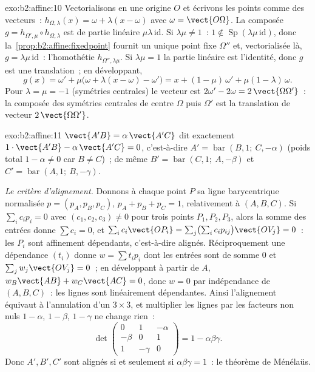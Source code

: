 \begin{solution}{exo:b2:affine:10}
Vectorialisons en une origine $O$ et écrivons les points comme des
vecteurs~: $h_{\Omega, \lambda}(x) = \omega + \lambda(x - \omega)$ avec
$\omega = \vect{O\Omega}$. La composée $g = h_{\Omega',
\mu} \circ h_{\Omega, \lambda}$ est  de partie linéaire
$\mu\lambda\,\mathrm{id}$. Si $\lambda\mu \neq 1$~: $1 \notin
\operatorname{Sp}(\lambda\mu\,\mathrm{id})$, donc
la~\cref{prop:b2:affine:fixedpoint} fournit un unique point fixe
$\Omega''$ et, vectorialisée là, $g =
\lambda\mu\,\mathrm{id}$~: l'homothétie $h_{\Omega'',
\lambda\mu}$. Si $\lambda\mu = 1$ la partie linéaire est
l'identité, donc $g$ est une translation~; en développant,
\[
g(x) = \omega' + \mu\bigl(\omega + \lambda(x - \omega) -
\omega'\bigr) = x + (1 - \mu)\,\omega' + \mu(1 -
\lambda)\,\omega .
\]
Pour $\lambda = \mu = -1$ (symétries centrales) le vecteur est
$2\omega' - 2\omega = 2\,\vect{\Omega\Omega'}$~: la composée des
symétries centrales de centre $\Omega$ puis $\Omega'$ est la
translation de vecteur $2\,\vect{\Omega\Omega'}$.
\end{solution}

\begin{solution}{exo:b2:affine:11}
$\vect{A'B} = \alpha\,\vect{A'C}$ dit exactement $1\cdot
\vect{A'B} - \alpha\,\vect{A'C} = 0$, c'est-à-dire $A' =
\operatorname{bar}(B, 1;\ C, -\alpha)$ (poids total $1 -
\alpha \neq 0$ car $B \neq C$)~; de même $B' =
\operatorname{bar}(C, 1;\ A, -\beta)$ et $C' =
\operatorname{bar}(A, 1;\ B, -\gamma)$.

\emph{Le critère d'alignement.} Donnons à chaque point $P$ sa
ligne barycentrique normalisée $p = (p_A, p_B, p_C)$, $p_A + p_B +
p_C = 1$, relativement à $(A, B, C)$. Si $\sum_i c_i p_i = 0$
avec $(c_1, c_2, c_3) \neq 0$ pour trois points $P_1, P_2,
P_3$, alors la somme des entrées donne $\sum c_i = 0$, et
$\sum_i c_i \vect{OP_i} = \sum_j \bigl(\sum_i
c_ip_{ij}\bigr)\vect{OV_j} = 0$~: les $P_i$ sont affinement
dépendants, c'est-à-dire alignés. Réciproquement une dépendance 
$(t_i)$ donne $w = \sum t_ip_i$ dont les entrées sont de somme $0$
et $\sum_j w_j\vect{OV_j} = 0$~; en développant à partir de $A$, $w_B
\vect{AB} + w_C\vect{AC} = 0$, donc $w = 0$ par indépendance
 de $(A, B, C)$~: les lignes sont linéairement dépendantes.
Ainsi l'alignement équivaut à l'annulation d'un  $3 \times
3$, et multiplier les lignes par les facteurs non nuls $1 - \alpha$, $1
- \beta$, $1 - \gamma$ ne change rien~:
\[
\det\begin{pmatrix} 0 & 1 & -\alpha\\ -\beta & 0 & 1\\ 1 &
-\gamma & 0\end{pmatrix}
= 1 - \alpha\beta\gamma .
\]
Donc $A', B', C'$ sont alignés si et seulement si $\alpha\beta\gamma =
1$~: le théorème de Ménélaüs.
\end{solution}

